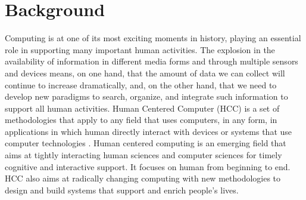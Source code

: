 
\chapter{Background} \label{sec:bg}
Computing is at one of its most exciting moments in history, playing an essential role in supporting many important human activities. The explosion in the availability of information in different media forms and through multiple sensors and devices means, on one hand, that the amount of data we can collect will continue to increase dramatically, and, on the other hand, that we need to develop new paradigms to search, organize, and integrate such information to support all human activities.
Human Centered Computer (HCC) is a set of methodologies that apply to any field that uses computers, in any form, in applications in which human directly interact with devices or systems that use computer technologies \cite{Jaimes2006f}.
Human centered computing is an emerging field that aims at tightly interacting human sciences and computer sciences for timely cognitive and interactive support.
It focuses on human from beginning to end. HCC also aims at radically changing computing with new methodologies to design and build systems that support and enrich people's lives. 

